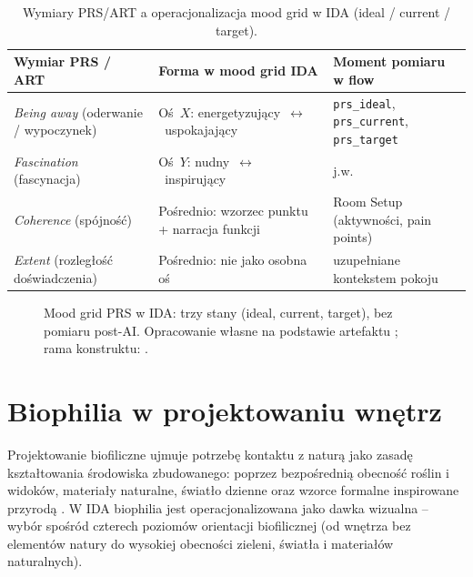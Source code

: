 \begin{table}[htbp]
  \centering
  \caption{Wymiary PRS/ART a operacjonalizacja mood grid w IDA (ideal / current / target).}
  \label{tab:ch02:prs-mood-grid}
  \begin{tabular}{@{}p{}p{}p{}@{}}
    \toprule
    Wymiar PRS / ART & Forma w mood grid IDA & Moment pomiaru w flow \\
    \midrule
    \emph{Being away} (oderwanie / wypoczynek)
      & Oś~$X$: energetyzujący~$\leftrightarrow$~uspokajający
      & \texttt{prs\_ideal}, \texttt{prs\_current}, \texttt{prs\_target} \\
    \emph{Fascination} (fascynacja)
      & Oś~$Y$: nudny~$\leftrightarrow$~inspirujący
      & j.w. \\
    \emph{Coherence} (spójność)
      & Pośrednio: wzorzec punktu + narracja funkcji
      & Room Setup (aktywności, pain points) \\
    \emph{Extent} (rozległość doświadczenia)
      & Pośrednio: nie jako osobna oś
      & uzupełniane kontekstem pokoju \\
    \bottomrule
  \end{tabular}
\end{table}

\begin{figure}[htbp]
  \centering
  \caption{Mood grid PRS w IDA: trzy stany (ideal, current, target), bez pomiaru post-AI.
    Opracowanie własne na podstawie artefaktu \parencite{idaPlatform2026}; rama konstruktu: \textcite{hartig1997prs}.}
  \label{fig:ch02:prs-mood-grid}
\end{figure}

\section{Biophilia w projektowaniu wnętrz}
\label{ch02:sec:biophilia}

Projektowanie biofiliczne ujmuje potrzebę kontaktu z naturą jako zasadę kształtowania środowiska zbudowanego: poprzez bezpośrednią obecność roślin i widoków, materiały naturalne, światło dzienne oraz wzorce formalne inspirowane przyrodą \parencite{kellert2008biophilic}.
W IDA biophilia jest operacjonalizowana jako dawka wizualna -- wybór spośród czterech poziomów orientacji biofilicznej (od wnętrza bez elementów natury do wysokiej obecności zieleni, światła i materiałów naturalnych).

